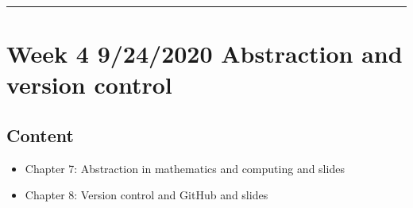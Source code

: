 \documentclass[letterpaper,10pt,english]{sphinxmanual}
\begin{document}
\bigskip\hrule\bigskip



\section{Week 4 \sphinxhyphen{} 9/24/2020 \sphinxhyphen{} Abstraction and version control}
\label{\detokenize{course-schedule:week-4-9-24-2020-abstraction-and-version-control}}

\subsection{Content}
\label{\detokenize{course-schedule:id5}}\begin{itemize}
\item {} 
Chapter 7: Abstraction in mathematics and computing \sphinxhyphen{} {\hyperref[\detokenize{chapter-7-abstraction::doc}]{}} and slides

\item {} 
Chapter 8: Version control and GitHub \sphinxhyphen{} {\hyperref[\detokenize{chapter-8-version-control::doc}]{}} and slides

\end{itemize}
\end{document}

